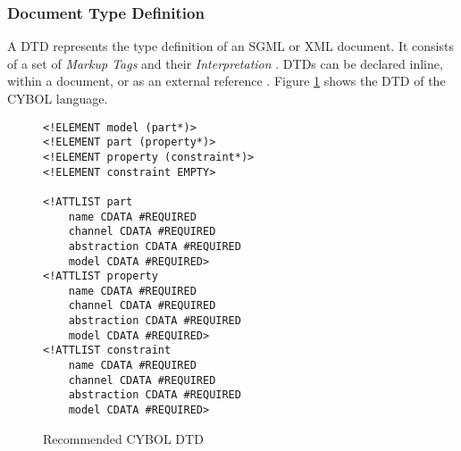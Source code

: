 %
%
%
%
%
%
%

\subsubsection{Document Type Definition}
\label{document_type_definition_heading}

A DTD represents the type definition of an SGML or XML document. It consists of
a set of \emph{Markup Tags} and their \emph{Interpretation} \cite{foldoc}. DTDs
can be declared inline, within a document, or as an external reference
\cite{w3schools}. Figure \ref{dtd_figure} shows the DTD of the CYBOL language.

\begin{figure}[ht]
    \bigskip
    \begin{scriptsize}
        \begin{verbatim}
<!ELEMENT model (part*)>
<!ELEMENT part (property*)>
<!ELEMENT property (constraint*)>
<!ELEMENT constraint EMPTY>

<!ATTLIST part
    name CDATA #REQUIRED
    channel CDATA #REQUIRED
    abstraction CDATA #REQUIRED
    model CDATA #REQUIRED>
<!ATTLIST property
    name CDATA #REQUIRED
    channel CDATA #REQUIRED
    abstraction CDATA #REQUIRED
    model CDATA #REQUIRED>
<!ATTLIST constraint
    name CDATA #REQUIRED
    channel CDATA #REQUIRED
    abstraction CDATA #REQUIRED
    model CDATA #REQUIRED>
        \end{verbatim}
    \end{scriptsize}
    \caption{Recommended CYBOL DTD}
    \label{dtd_figure}
\end{figure}

